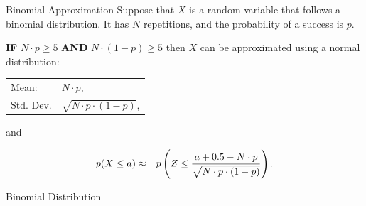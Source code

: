 \begin{frame}

  \begin{block}{Binomial Approximation}
    Suppose that $X$ is a random variable that follows a binomial
    distribution. It has $N$ repetitions, and the probability of a
    success is $p$. 

    \textbf{IF} $N\cdot p\geq 5$ \textbf{AND} $N\cdot (1-p) \geq 5$
    then $X$ can be approximated using a normal distribution:

    \begin{center}
      \begin{tabular}{ll}
        Mean: & $N\cdot p$, \\
        Std. Dev. & $\sqrt{N\cdot p \cdot (1-p)}$,
      \end{tabular}
    \end{center}

    and

    \begin{eqnarray*}
      p(X \leq a) & \approx &
       p\left( Z \leq \frac{a+0.5-N\cdot p}{\sqrt{N\cdot p \cdot (1-p)}}\right).
    \end{eqnarray*}

  \end{block}

\end{frame}

\begin{frame}{Binomial Distribution}

  
\end{frame}

